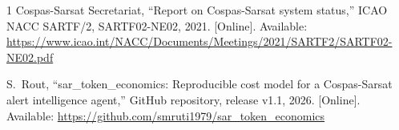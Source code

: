 \documentclass[conference]{IEEEtran}
\begin{document}
\begin{thebibliography}{1}
Cospas-Sarsat Secretariat, ``Report on Cospas-Sarsat system status,'' ICAO NACC SARTF/2, SARTF02-NE02, 2021. [Online]. Available: \url{https://www.icao.int/NACC/Documents/Meetings/2021/SARTF2/SARTF02-NE02.pdf}

S.~Rout, ``sar\_token\_economics: Reproducible cost model for a Cospas-Sarsat alert intelligence agent,'' GitHub repository, release v1.1, 2026. [Online]. Available: \url{https://github.com/smruti1979/sar_token_economics}

\end{thebibliography}
\end{document}
